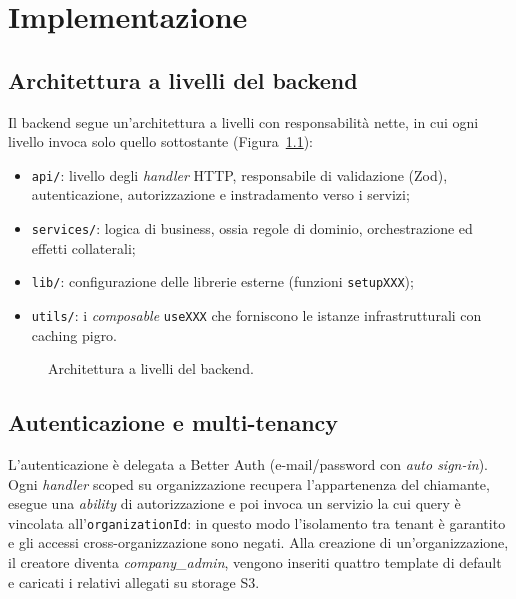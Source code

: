 \documentclass[12pt,a4paper,oneside]{report}
\newcommand{\code}[1]{\texttt{\small #1}}
\begin{document}
\chapter{Implementazione}

\section{Architettura a livelli del backend}
Il backend segue un'architettura a livelli con responsabilit\`a nette, in cui ogni livello
invoca solo quello sottostante (Figura~\ref{fig:layers}):
\begin{itemize}[nosep]
  \item \code{api/}: livello degli \emph{handler} HTTP, responsabile di validazione (Zod),
        autenticazione, autorizzazione e instradamento verso i servizi;
  \item \code{services/}: logica di business, ossia regole di dominio, orchestrazione ed
        effetti collaterali;
  \item \code{lib/}: configurazione delle librerie esterne (funzioni \code{setupXXX});
  \item \code{utils/}: i \emph{composable} \code{useXXX} che forniscono le istanze
        infrastrutturali con caching pigro.
\end{itemize}

\begin{figure}[h]
\centering
{}
\caption{Architettura a livelli del backend.}
\label{fig:layers}
\end{figure}

\section{Autenticazione e multi-tenancy}
L'autenticazione \`e delegata a Better Auth (e-mail/password con \emph{auto sign-in}).
Ogni \emph{handler} scoped su organizzazione recupera l'appartenenza del chiamante, esegue
una \emph{ability} di autorizzazione e poi invoca un servizio la cui query \`e vincolata
all'\code{organizationId}: in questo modo l'isolamento tra tenant \`e garantito e gli accessi
cross-organizzazione sono negati. Alla creazione di un'organizzazione, il creatore diventa
\emph{company\_admin}, vengono inseriti quattro template di default e caricati i relativi
allegati su storage S3.
\end{document}
